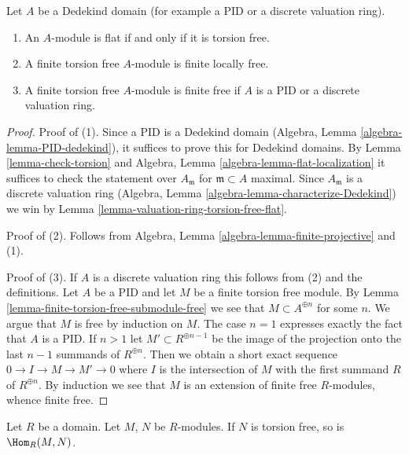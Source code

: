 \begin{lemma}
\label{lemma-dedekind-torsion-free-flat}
Let $A$ be a Dedekind domain (for example a PID or a discrete valuation ring).
\begin{enumerate}
\item An $A$-module is flat if and only if it is torsion free.
\item A finite torsion free $A$-module is finite locally free.
\item A finite torsion free $A$-module is finite free if
$A$ is a PID or a discrete valuation ring.
\end{enumerate}
\end{lemma}

\begin{proof}
Proof of (1). Since a PID is a Dedekind domain
(Algebra, Lemma \ref{algebra-lemma-PID-dedekind}),
it suffices to prove this for Dedekind domains.
By Lemma \ref{lemma-check-torsion}
and Algebra, Lemma \ref{algebra-lemma-flat-localization}
it suffices to check the statement over $A_\mathfrak m$
for $\mathfrak m \subset A$ maximal. Since $A_\mathfrak m$
is a discrete valuation ring
(Algebra, Lemma \ref{algebra-lemma-characterize-Dedekind})
we win by Lemma \ref{lemma-valuation-ring-torsion-free-flat}.

\medskip\noindent
Proof of (2). Follows from
Algebra, Lemma \ref{algebra-lemma-finite-projective}
and (1).

\medskip\noindent
Proof of (3). If $A$ is a discrete valuation ring this follows from
(2) and the definitions. Let $A$ be a PID and let $M$ be a finite
torsion free module. By Lemma \ref{lemma-finite-torsion-free-submodule-free}
we see that $M \subset A^{\oplus n}$ for some $n$. We argue that
$M$ is free by induction on $M$. The case $n = 1$ expresses exactly the
fact that $A$ is a PID. If $n > 1$ let $M' \subset R^{\oplus n - 1}$
be the image of the projection onto the last $n - 1$ summands of
$R^{\oplus n}$. Then we obtain a short exact sequence
$0 \to I \to M \to M' \to 0$ where $I$ is the intersection of $M$
with the first summand $R$ of $R^{\oplus n}$. By induction we
see that $M$ is an extension of finite free $R$-modules, whence
finite free.
\end{proof}

\begin{lemma}
\label{lemma-hom-into-torsion-free}
Let $R$ be a domain. Let $M$, $N$ be $R$-modules.
If $N$ is torsion free, so is $\Hom_R(M, N)$.
\end{lemma}

